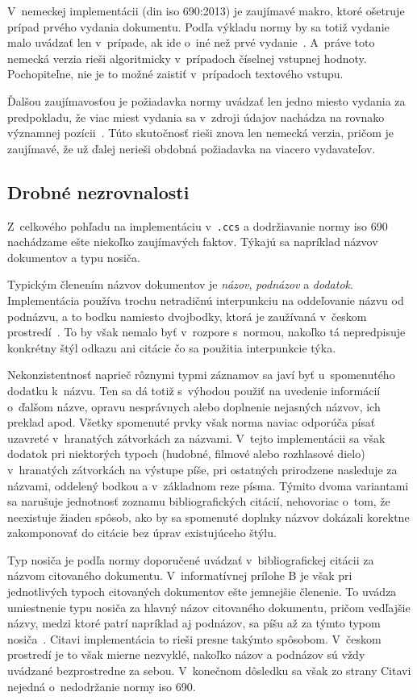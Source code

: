 \documentclass[
  color,
  table,
  nolof,
  oneside,
]{fithesis3}
\begin{document}
V~nemeckej implementácii (\gls{din} \gls{iso} 690:2013) je zaujímavé makro, ktoré ošetruje prípad prvého vydania dokumentu. Podľa výkladu normy by sa totiž vydanie malo uvádzať len v~prípade, ak ide o~iné než prvé vydanie~\cite{csn:iso690:2011}. A~práve toto nemecká verzia rieši algoritmicky v~prípadoch číselnej vstupnej hodnoty. Pochopiteľne, nie je to možné zaistiť v~prípadoch textového vstupu.

Ďalšou zaujímavosťou je požiadavka normy uvádzať len jedno miesto vydania za predpokladu, že viac miest vydania sa v~zdroji údajov nachádza na rovnako významnej pozícii~\cite{csn:iso690:2011}. Túto skutočnosť rieši znova len nemecká verzia, pričom je zaujímavé, že už ďalej nerieši obdobná požiadavka na viacero vydavateľov.

\subsection{Drobné nezrovnalosti}

Z~celkového pohľadu na implementáciu v~\texttt{.ccs} a dodržiavanie normy \gls{iso} 690 nachádzame ešte niekoľko zaujímavých faktov. Týkajú sa napríklad názvov dokumentov a typu nosiča.

Typickým členením názvov dokumentov je \emph{názov}, \emph{podnázov} a \emph{dodatok}. Implementácia používa trochu netradičnú interpunkciu na oddeľovanie názvu od podnázvu, a to bodku namiesto dvojbodky, ktorá je zaužívaná v~českom prostredí~\cite{Biernatova2011, Bratkova2011}. To by však nemalo byť v~rozpore s~normou, nakoľko tá nepredpisuje konkrétny štýl odkazu ani citácie čo sa použitia interpunkcie týka.

Nekonzistentnosť naprieč rôznymi typmi záznamov sa javí byť u~spomenutého dodatku k~názvu. Ten sa dá totiž s~výhodou použiť na uvedenie informácií o~ďalšom názve, opravu nesprávnych alebo doplnenie nejasných názvov, ich preklad apod. Všetky spomenuté prvky však norma naviac odporúča písať uzavreté v~hranatých zátvorkách za názvami. V~tejto implementácii sa však dodatok pri niektorých typoch (hudobné, filmové alebo rozhlasové dielo) v~hranatých zátvorkách na výstupe píše, pri ostatných prirodzene nasleduje za názvami, oddelený bodkou a v~základnom reze písma. Týmito dvoma variantami sa narušuje jednotnosť zoznamu bibliografických citácií, nehovoriac o~tom, že neexistuje žiaden spôsob, ako by sa spomenuté doplnky názvov dokázali korektne zakomponovať do citácie bez úprav existujúceho štýlu.

Typ nosiča je podľa normy doporučené uvádzať v~bibliografickej citácii za názvom citovaného dokumentu. V~informatívnej prílohe B je však pri jednotlivých typoch citovaných dokumentov ešte jemnejšie členenie. To uvádza umiestnenie typu nosiča za hlavný názov citovaného dokumentu, pričom vedľajšie názvy, medzi ktoré patrí napríklad aj podnázov, sa píšu až za týmto typom nosiča~\cite{csn:iso690:2011}. Citavi implementácia to rieši presne takýmto spôsobom. V~českom prostredí je to však mierne nezvyklé, nakoľko názov a podnázov sú vždy uvádzané bezprostredne za sebou. V~konečnom dôsledku sa však zo strany Citavi nejedná o~nedodržanie normy \gls{iso} 690.
\end{document}
